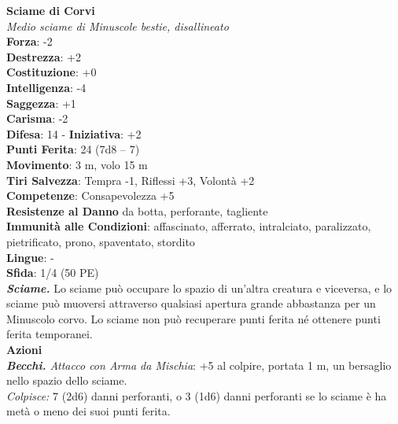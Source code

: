 \begin{multicols}{2}
\medskip\textbf{Sciame di Corvi}\\
\emph{Medio sciame di Minuscole bestie, disallineato}\\
\textbf{Forza}: -2\\
\textbf{Destrezza}: +2\\
\textbf{Costituzione}: +0\\
\textbf{Intelligenza}: -4\\
\textbf{Saggezza}: +1\\
\textbf{Carisma}: -2\\
\textbf{Difesa}: 14 - \textbf{Iniziativa}: +2\\
\textbf{Punti Ferita}: 24 (7d8 -- 7)\\
\textbf{Movimento}: 3 m, volo 15 m\\
\textbf{Tiri Salvezza}: Tempra -1, Riflessi +3, Volontà +2\\
\textbf{Competenze}: Consapevolezza +5\\
\textbf{Resistenze al Danno} da botta, perforante, tagliente \\
\textbf{Immunità alle Condizioni}: affascinato, afferrato, intralciato, paralizzato, pietrificato, prono, spaventato, stordito\\
\textbf{Lingue}: -\\
\textbf{Sfida}: 1/4 (50 PE)\smallskip\\
\emph{\textbf{Sciame.}} Lo sciame può occupare lo spazio di un'altra creatura e viceversa, e lo sciame può muoversi attraverso qualsiasi apertura grande abbastanza per un Minuscolo corvo. Lo sciame non può recuperare punti ferita né ottenere punti ferita temporanei.\\
\smallskip\textbf{Azioni}\\
\emph{\textbf{Becchi.} Attacco con Arma da Mischia}: +5 al colpire, portata 1 m, un bersaglio nello spazio dello sciame.\\
\emph{Colpisce:} 7 (2d6) danni perforanti, o 3 (1d6) danni perforanti se lo sciame è ha metà o meno dei suoi punti ferita.\\


\end{multicols}
